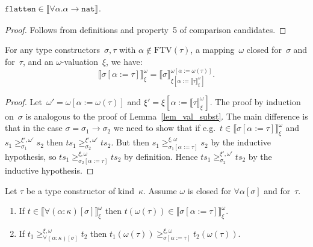\documentclass[a4paper,UKenglish,cleveref,autoref,numberwithinsect]{lipics-v2019}
\theoremstyle{definition}
\newcommand{\arrtype}{\rightarrow}
\newcommand{\subst}[2]{#1:=#2}
\newcommand{\nat}{\mathtt{nat}}
\newcommand{\flatten}{\mathtt{flatten}}
\newcommand{\FTV}{\mathrm{FTV}}
\newcommand{\val}[3]{\ensuremath{\llbracket#1\rrbracket_{#2}^{#3}}}
\newcommand{\gteq}[3]{\ensuremath{\ge_{#1}^{#2,#3}}}
\begin{document}
\begin{lemma}\label{lem_wm_flatten}
  $\flatten \in \val{\forall\alpha.\alpha\arrtype\nat}{}{}$.
\end{lemma}

\begin{proof}
  Follows from definitions and property~5 of comparison candidates.
\end{proof}

\begin{lemma}\label{lem_val_subst_wm}
  For any type constructors~$\sigma,\tau$ with $\alpha \notin
  \FTV(\tau)$, a mapping~$\omega$ closed for~$\sigma$ and for~$\tau$,
  and an $\omega$-valuation~$\xi$, we have:
  \[
  \val{\sigma[\subst{\alpha}{\tau}]}{\xi}{\omega} =
  \val{\sigma}{\xi[\subst{\alpha}{\val{\tau}{\xi}{\omega}}]}{\omega[\subst{\alpha}{\omega(\tau)}]}.
  \]
\end{lemma}

\begin{proof}
  Let~$\omega' = \omega[\subst{\alpha}{\omega(\tau)}]$ and $\xi' =
  \xi[\subst{\alpha}{\val{\tau}{\xi}{\omega}}]$. The proof by
  induction on~$\sigma$ is analogous to the proof of
  Lemma~\ref{lem_val_subst}. The main difference is that in the case
  $\sigma = \sigma_1\arrtype\sigma_2$ we need to show that if e.g.~$t
  \in \val{\sigma[\subst{\alpha}{\tau}]}{\xi}{\omega}$ and $s_1
  \gteq{\sigma_1}{\xi'}{\omega'} s_2$ then $t s_1
  \gteq{\sigma_2}{\xi'}{\omega'} t s_2$. But then $s_1
  \gteq{\sigma_1[\subst{\alpha}{\tau}]}{\xi}{\omega} s_2$ by the
  inductive hypothesis, so $t s_1
  \gteq{\sigma_2[\subst{\alpha}{\tau}]}{\xi}{\omega} t s_2$ by
  definition. Hence $t s_1 \gteq{\sigma_2}{\xi'}{\omega'} t s_2$ by
  the inductive hypothesis.
\end{proof}

\begin{lemma}\label{lem_wm_forall}
  Let $\tau$ be a type constructor of kind~$\kappa$. Assume $\omega$
  is closed for $\forall\alpha[\sigma]$ and for~$\tau$.
  \begin{enumerate}
  \item If $t \in \val{\forall(\alpha:\kappa)[\sigma]}{\xi}{\omega}$
    then $t (\omega(\tau)) \in
    \val{\sigma[\subst{\alpha}{\tau}]}{\xi}{\omega}$.
  \item If $t_1 \gteq{\forall(\alpha:\kappa)[\sigma]}{\xi}{\omega}
    t_2$ then $t_1 (\omega(\tau))
    \gteq{\sigma[\subst{\alpha}{\tau}]}{\xi}{\omega} t_2
    (\omega(\tau))$.
  \end{enumerate}
\end{lemma}
\end{document}
